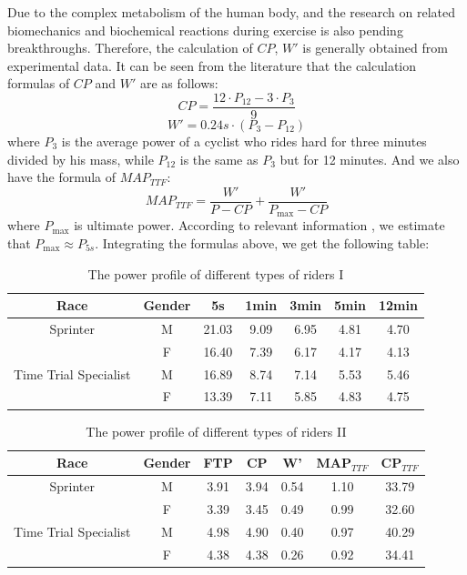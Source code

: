 \documentclass{mcmthesis}
\begin{document}
Due to the complex metabolism of the human body, and the research on related biomechanics
and biochemical reactions during exercise is also pending breakthroughs. Therefore, the calculation
of $CP$, $W'$
is generally obtained from experimental data. It can be seen from the literature \cite{key9} that
the calculation formulas of $CP$ and $W'$
are as follows:
\begin{equation}
    CP = \frac{12 \cdot P_{12} - 3 \cdot P_{3}}{9}
    \label{eq:cp}
\end{equation}
\begin{equation}
    W' = 0.24s \cdot \left( P_{3} - P_{12} \right)
    \label{eq:wprime}
\end{equation}
where $P_3$ is the average power of a cyclist who rides hard for three minutes divided by his mass,
while $P_{12}$ is the same as $P_3$ but for 12 minutes. And we also have the formula of $MAP_{TTF}$:
\begin{equation}
    MAP_{TTF} = \frac{W'}{P - CP} + \frac{W'}{P_{\max} - CP}
    \label{eq:mapttf}
\end{equation}
where $P_{\max}$ is ultimate power. According to relevant information \cite{key9}, we estimate that $P_{\max} \approx P_{5s}$.
Integrating the formulas above, we get the following table:
\begin{table}[ht]
  \centering
  \caption{The power profile of different types of riders I}
  \label{tab:power_profile_I}
  \vspace{-0.4cm}
  \begin{tabular}{ccccccc}
    \toprule
    Race & Gender & 5s & 1min & 3min & 5min & 12min \\
    \midrule
    Sprinter & M & 21.03 & 9.09 & 6.95 & 4.81 & 4.70 \\
     & F & 16.40 & 7.39 & 6.17 & 4.17 & 4.13 \\
    Time Trial Specialist & M & 16.89 & 8.74 & 7.14 & 5.53 & 5.46 \\
     & F & 13.39 & 7.11 & 5.85 & 4.83 & 4.75 \\
    \bottomrule
  \end{tabular}
\end{table}
\vspace{-0.5cm}
\begin{table}[ht]
  \centering
  \caption{The power profile of different types of riders II}
  \vspace{-0.4cm}
  \label{tab:power_profile_II}
  \begin{tabular}{ccccccc}
    \toprule
    Race & Gender & FTP & CP & W' & MAP$_{TTF}$ & CP$_{TTF}$ \\
    \midrule
    Sprinter & M & 3.91 & 3.94 & 0.54 & 1.10 & 33.79 \\
     & F & 3.39 & 3.45 & 0.49 & 0.99 & 32.60 \\
    Time Trial Specialist & M & 4.98 & 4.90 & 0.40 & 0.97 & 40.29 \\
     & F & 4.38 & 4.38 & 0.26 & 0.92 & 34.41 \\
    \bottomrule
  \end{tabular}
\end{table}
\end{document}
